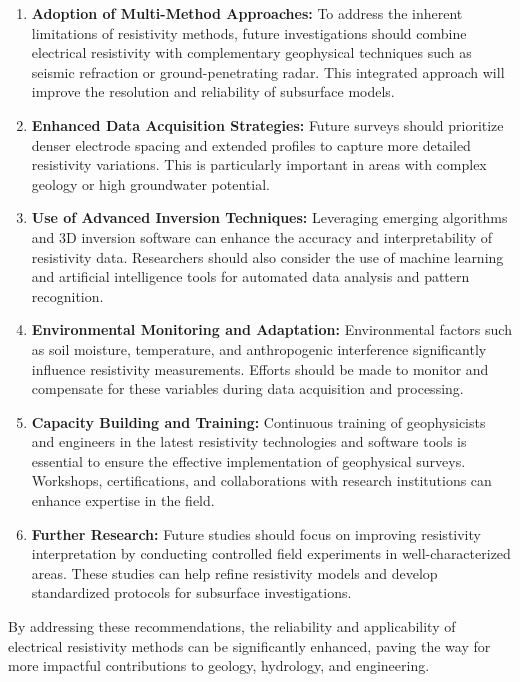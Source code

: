 \documentclass[12pt,a4paper]{report}
\begin{document}
\begin{enumerate}
    \item \textbf{Adoption of Multi-Method Approaches:} To address the inherent limitations of resistivity methods, future investigations should combine electrical resistivity with complementary geophysical techniques such as seismic refraction or ground-penetrating radar. This integrated approach will improve the resolution and reliability of subsurface models.
    
    \item \textbf{Enhanced Data Acquisition Strategies:} Future surveys should prioritize denser electrode spacing and extended profiles to capture more detailed resistivity variations. This is particularly important in areas with complex geology or high groundwater potential.
    
    \item \textbf{Use of Advanced Inversion Techniques:} Leveraging emerging algorithms and 3D inversion software can enhance the accuracy and interpretability of resistivity data. Researchers should also consider the use of machine learning and artificial intelligence tools for automated data analysis and pattern recognition.
    
    \item \textbf{Environmental Monitoring and Adaptation:} Environmental factors such as soil moisture, temperature, and anthropogenic interference significantly influence resistivity measurements. Efforts should be made to monitor and compensate for these variables during data acquisition and processing.
    
    \item \textbf{Capacity Building and Training:} Continuous training of geophysicists and engineers in the latest resistivity technologies and software tools is essential to ensure the effective implementation of geophysical surveys. Workshops, certifications, and collaborations with research institutions can enhance expertise in the field.
     
    \item \textbf{Further Research:} Future studies should focus on improving resistivity interpretation by conducting controlled field experiments in well-characterized areas. These studies can help refine resistivity models and develop standardized protocols for subsurface investigations.
\end{enumerate}

By addressing these recommendations, the reliability and applicability of electrical resistivity methods can be significantly enhanced, paving the way for more impactful contributions to geology, hydrology, and engineering.
\end{document}
